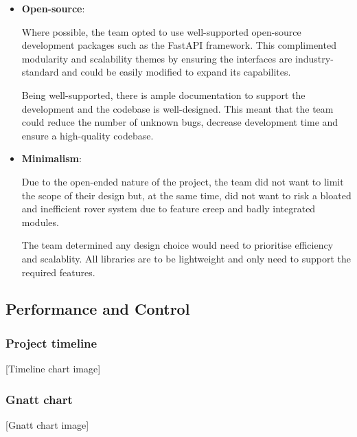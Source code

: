 \documentclass[11pt, a4paper]{article}
\begin{document}
\begin{itemize}
    \item \textbf{Open-source}: 
    
    Where possible, the team opted to use well-supported open-source development packages such as the FastAPI framework. This complimented modularity and scalability themes by ensuring the interfaces are industry-standard and could be easily modified to expand its capabilites. 
    
    Being well-supported, there is ample documentation to support the development and the codebase is well-designed. This meant that the team could reduce the number of unknown bugs, decrease development time and ensure a high-quality codebase.     

    \item \textbf{Minimalism}:
    
    Due to the open-ended nature of the project, the team did not want to limit the scope of their design but, at the same time, did not want to risk a bloated and inefficient rover system due to feature creep and badly integrated modules. 
    
    The team determined any design choice would need to prioritise efficiency and scalablity. All libraries are to be lightweight and only need to support the required features. 
    
\end{itemize}

\vfill

\pagebreak
\subsection{Performance and Control}

\subsubsection{Project timeline}

\begin{center}
    [Timeline chart image]
\end{center}


\subsubsection{Gnatt chart}

\begin{center}
    [Gnatt chart image]
\end{center}


\pagebreak
\end{document}
